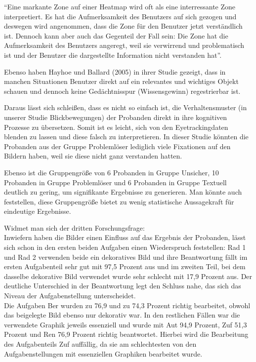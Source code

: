 ``Eine markante Zone auf einer Heatmap wird oft als eine interressante Zone interpretiert. Es hat die Aufmerksamkeit des Benutzers auf sich gezogen und deswegen wird angenommen, dass die Zone für den Benutzer jetzt verständlich ist. Dennoch kann aber auch das Gegenteil der Fall sein: Die Zone hat die Aufmerksamkeit des Benutzers angeregt, weil sie verwirrend und problematisch ist und der Benutzer die dargestellte Information nicht verstanden hat''\cite{hyrskykari2008gaze}.

Ebenso haben Hayhoe und Ballard (2005) in ihrer Studie gezeigt, dass in manchen Situationen Benutzer direkt auf ein relevantes und wichtiges Objekt schauen und dennoch keine Gedächtnisspur (Wissensgewinn) regestrierbar ist\cite{hayhoe2005eye}. 

Daraus lässt sich schleißen, dass es nicht so einfach ist, die Verhaltensmuster (in unserer Studie Blickbewegungen) der Probanden direkt in ihre kognitiven Prozesse zu übersetzen. Somit ist es leicht, sich von den Eyetrackingdaten blenden zu lassen und diese falsch zu interpretieren. In dieser Studie könnten die Probanden aus der Gruppe Problemlöser lediglich viele Fixationen auf den Bildern haben, weil sie diese nicht ganz verstanden hatten. 

Ebenso ist die Gruppengröße von 6 Probanden in Gruppe Unsicher, 10 Probanden in Gruppe Problemlöser und 6 Probanden in Gruppe Textuell deutlich zu gering, um signifikante Ergebnisse zu generieren. Man könnte auch feststellen, diese Gruppengröße bietet zu wenig statistische Aussagekraft für eindeutige Ergebnisse. 

Widmet man sich der dritten Forschungsfrage:\\
Inwiefern haben die Bilder einen Einfluss auf das Ergebnis der Probanden, lässt sich schon in den ersten beiden Aufgaben einen Wiederspruch feststellen: \gls{Rad} 1 und \gls{Rad} 2 verwenden beide ein dekoratives Bild und ihre Beantwortung fällt im ersten Aufgabenteil sehr gut mit 97,5 Prozent aus und im zweiten Teil, bei dem dasselbe dekorative Bild verwendet wurde sehr schlecht mit 17,9 Prozent aus. Der deutliche Unterschied in der Beantwortung legt den Schluss nahe, das sich das Niveau der Aufgabenstellung unterscheidet.\\
Die Aufgaben \gls{Ber} wurden zu 76,9 und zu 74,3 Prozent richtig bearbeitet, obwohl das beigelegte Bild ebenso nur dekorativ war. In den restlichen Fällen war die verwendete Graphik jeweils essenziell und wurde mit \gls{Aut} 94,9 Prozent, \gls{Zuf} 51,3 Prozent und \gls{Ren} 76,9 Prozent richtig beantwortet. Hierbei wird die Bearbeitung des Aufgabenteils \gls{Zuf} auffällig, da sie am schlechtesten von den Aufgabenstellungen mit essenziellen Graphiken bearbeitet wurde. 


